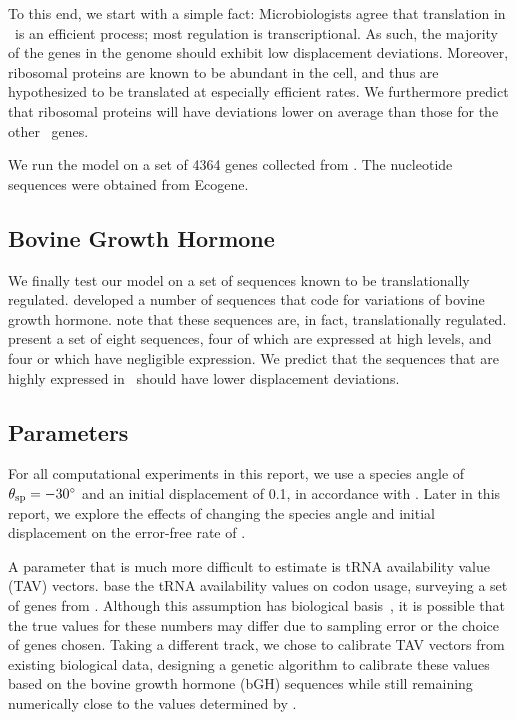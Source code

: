 \documentclass[12pt]{article}
\numberwithin{equation}{section}
\begin{document}
To this end, we start with a simple fact:
Microbiologists agree that translation in \ecoli\ is an efficient process;
most regulation is transcriptional.  As such, the majority of the genes 
in the genome should exhibit low displacement deviations.  Moreover,
ribosomal proteins are known to be abundant in the cell, and thus
are hypothesized to be translated at especially efficient rates.  We
furthermore predict that ribosomal proteins will have deviations lower
on average than those for the other \ecoli\ genes.

We run the model on a set of 4364 genes collected from \ecoli.  The
nucleotide sequences were obtained from Ecogene.

\subsection{Bovine Growth Hormone}
We finally test our model on a set of sequences known to be translationally 
regulated.  \citet{schoner:bgh} developed a number of sequences that
code for variations of bovine growth hormone. \citeauthor{schoner:bgh}
note that these sequences are, in fact, translationally regulated.
\citeauthor{schoner:bgh} present a set of eight sequences, four of which
are expressed at high levels, and four or which have negligible expression.
We predict that the sequences that are highly expressed in
\ecoli\ should have lower displacement deviations.

\subsection{Parameters}
\label{section:parameters}
For all computational experiments in this report, we use a species
angle of $\theta_{\rm{sp}} = -30^\circ$ and an initial displacement of 0.1,
in accordance with \citet{lalit:embs}.  Later in this report, we explore
the effects of changing the species angle and initial displacement on the
error-free rate of \prfB.

A parameter that is much more difficult to estimate
is tRNA availability value (TAV) vectors.
\citeauthor{lalit:embs} base the tRNA availability values on codon usage, 
surveying a set of genes from \ecoli.
Although this assumption has biological basis~\cite{ikemura}, 
it is possible that the true values for these numbers may differ 
due to sampling error or the choice of genes chosen.
Taking a different track, we chose to calibrate TAV vectors from
existing biological data, designing a genetic algorithm to calibrate
these values based on the bovine growth hormone (bGH) sequences
while still remaining numerically close to the values determined by \citeauthor{lalit:embs}.
\end{document}
